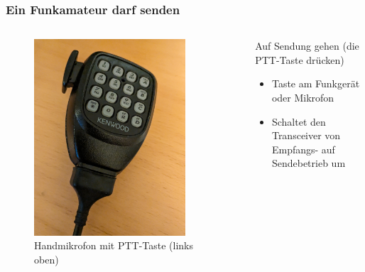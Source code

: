 \begin{frame}
\frametitle{Ein Funkamateur darf senden}
\begin{columns}
    \begin{column}{0.48\textwidth}
    
\begin{figure}
    \includegraphics[width=0.85\textwidth]{foto/118}
    \caption{\scriptsize Handmikrofon mit PTT-Taste (links oben)}
    \label{n_erste_schritte_ptt}
\end{figure}

    \end{column}
   \begin{column}{0.48\textwidth}
       Auf Sendung gehen (die PTT-Taste drücken)

\begin{itemize}
  \item Taste am Funkgerät oder Mikrofon
  \item Schaltet den Transceiver von Empfangs- auf Sendebetrieb um
  \end{itemize}

   \end{column}
\end{columns}

\end{frame}

